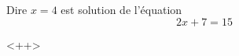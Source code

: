 
\begin{mental}
    Dire \( x=4\) est solution de l'équation
    \begin{equation}
        2x+7=15
    \end{equation}
\end{mental}
<++>
